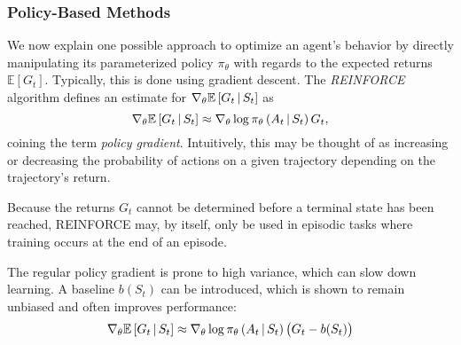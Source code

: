 \subsubsection{Policy-Based Methods}
We now explain one possible approach to optimize an agent's behavior by directly manipulating its parameterized policy $\pi_\theta$ with regards to the expected returns $\mathbb{E}\left[G_t\right]$. Typically, this is done using gradient descent. The \textit{REINFORCE} algorithm \cite{reinforce} defines an estimate for $\nabla_\theta \mathbb{E}\left[G_t \,\middle|\, S_t \right]$ as
\begin{equation*}
    \nabla_\theta \mathbb{E}\left[G_t \,\middle|\, S_t \right] \approx \nabla_\theta \log \pi_\theta\left(A_t \,\middle|\, S_t\right) G_t,
\end{equation*}
coining the term \textit{policy gradient}. Intuitively, this may be thought of as increasing or decreasing the probability of actions on a given trajectory depending on the trajectory's return.

Because the returns $G_t$ cannot be determined before a terminal state has been reached, REINFORCE may, by itself, only be used in episodic tasks where training occurs at the end of an episode.

The regular policy gradient is prone to high variance, which can slow down learning. A baseline $b(S_t)$ can be introduced, which is shown to remain unbiased and often improves performance:
\begin{equation*}
    \nabla_\theta \mathbb{E}\left[G_t \,\middle|\, S_t \right] \approx \nabla_\theta \log \pi_\theta\left(A_t \,\middle|\, S_t\right) \left(G_t - b(S_t)\right)
\end{equation*}